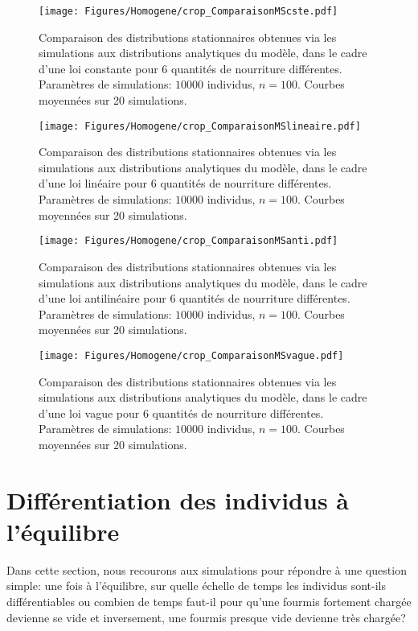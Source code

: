\begin{figure}[h]
\centering
\texttt{[image: Figures/Homogene/crop\_ComparaisonMScste.pdf]}
\caption{Comparaison des distributions stationnaires obtenues via les simulations aux distributions analytiques du modèle, dans le cadre d'une loi constante pour 6 quantités de nourriture différentes. Paramètres de simulations: $10000$ individus, $n=100$. Courbes moyennées sur 20 simulations.}
\label{ComparaisonMScste}
\end{figure}

\begin{figure}[h]
\centering
\texttt{[image: Figures/Homogene/crop\_ComparaisonMSlineaire.pdf]}
\caption{Comparaison des distributions stationnaires obtenues via les simulations aux distributions analytiques du modèle, dans le cadre d'une loi linéaire pour 6 quantités de nourriture différentes. Paramètres de simulations: $10000$ individus, $n=100$. Courbes moyennées sur 20 simulations.}
\label{ComparaisonMSlineaire}
\end{figure}

\begin{figure}[h]
\centering
\texttt{[image: Figures/Homogene/crop\_ComparaisonMSanti.pdf]}
\caption{Comparaison des distributions stationnaires obtenues via les simulations aux distributions analytiques du modèle, dans le cadre d'une loi antilinéaire pour 6 quantités de nourriture différentes. Paramètres de simulations: $10000$ individus, $n=100$. Courbes moyennées sur 20 simulations.}
\label{ComparaisonMSanti}
\end{figure}

\begin{figure}[h]
\centering
\texttt{[image: Figures/Homogene/crop\_ComparaisonMSvague.pdf]}
\caption{Comparaison des distributions stationnaires obtenues via les simulations aux distributions analytiques du modèle, dans le cadre d'une loi vague pour 6 quantités de nourriture différentes. Paramètres de simulations: $10000$ individus, $n=100$. Courbes moyennées sur 20 simulations.}
\label{ComparaisonMSvague}
\end{figure}

\section{Différentiation des individus à l'équilibre}

Dans cette section, nous recourons aux simulations pour répondre à une question simple: une fois à l'équilibre, sur quelle échelle de temps les individus sont-ils différentiables ou combien de temps faut-il pour qu'une fourmis fortement chargée devienne se vide et inversement, une fourmis presque vide devienne très chargée?\\


